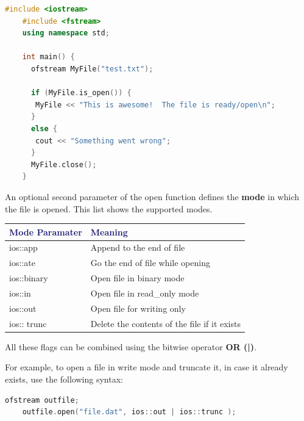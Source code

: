 \documentclass[12pt , a4paper]{article}
\begin{document}
	\begin{lstlisting}[language=C++]
	#include <iostream>
	#include <fstream>
	using namespace std;
	
	int main() {
	  ofstream MyFile("test.txt");
	
	  if (MyFile.is_open()) {
	   MyFile << "This is awesome!  The file is ready/open\n";
	  }
	  else {
	   cout << "Something went wrong";
	  }
	  MyFile.close();
	}		
	\end{lstlisting}
An optional second parameter of the open function defines the \textbf{mode} in which the file is opened. This list shows the supported modes.\\
	\begin{center}
		\begin{tabular}{ l | l }
		\hline 
		\textcolor{Midnightblue}{Mode Paramater} &  \textcolor{Midnightblue}{Meaning} \\ \hline 
		ios::app & Append to the end of file \\ \hline
		ios::ate & Go the end of file while opening \\ \hline
		ios::binary & Open file in binary mode \\ \hline
		ios::in & Open file in read\_only mode \\ \hline
		ios::out & Open file for writing only \\ \hline
		ios:: trunc & Delete the contents of the file if it exists \\ \hline
		\hline
		\end{tabular}
	\end{center}
All these flags can be combined using the bitwise operator \textbf{OR (|)}.\\
	\begin{problemDefBox}
	For example, to open a file in write mode and truncate it, in case it already exists, use the following syntax:
	\end{problemDefBox} 
	\begin{lstlisting}[language=C++]
	ofstream outfile;
	outfile.open("file.dat", ios::out | ios::trunc );	
	\end{lstlisting}
\end{document}
